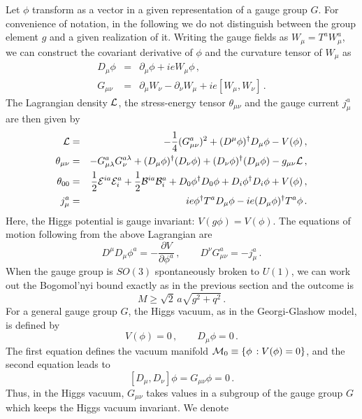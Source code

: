 Let $\phi$ transform as a vector in a given representation of a gauge
group $G$. For convenience of notation, in the following we do not
distinguish between the group element $g$ and a given realization of
it. Writing the gauge fields as $W_\mu=T^aW^a_\mu$, we can construct
the covariant derivative of $\phi$ and the curvature tensor of $W_\mu$
as
\begin{eqnarray}
D_\mu \phi &=& \partial_{\mu} \phi + ie W_{\mu} \phi\,,
\nonumber \\
G_{\mu\nu}&=&\partial_\mu W_\nu -\partial_\nu W_\mu +
ie [W_\mu, W_\nu] \,.
\nonumber
\end{eqnarray}
The Lagrangian density ${\cal L}$, the stress-energy tensor  
$\theta_{\mu\nu}$ and the gauge current $j^a_\mu$ are then given by  
\begin{eqnarray}
{\cal L}&=&-\frac{1}{4}(G^a_{\mu\nu})^2+(D^\mu\phi)^\dagger D_\mu\phi
-V(\phi) \,,
\nonumber\\
\theta_{\mu\nu}&=&-G^a_{\mu\lambda}G^{a\lambda}_\nu +
(D_\mu\phi)^\dagger(D_\nu\phi) + (D_\nu\phi)^\dagger(D_\mu\phi) 
- g_{\mu\nu} {\cal L} \,,
\nonumber \\
\theta_{00}&=& \frac{1}{2}{\cal E}^{ia}{\cal E}^a_i +
\frac{1}{2}{\cal B}^{ia}{\cal B}^a_i +D_0\phi^\dagger D_0\phi +
D_i\phi^\dagger D_i\phi + V(\phi)\,,
\nonumber \\
j^a_\mu &=& ie \phi^\dagger T^a D_\mu\phi -
ie (D_\mu\phi)^\dagger T^a \phi\,.
\label{LIII}
\end{eqnarray}
Here, the Higgs potential is gauge invariant: $V(g\phi)=V(\phi)$. 
The equations of motion following from the above Lagrangian are 
\begin{equation}
D^\mu D_\mu\phi^a=-\frac{\partial V}{\partial \phi^a}\,,\qquad
D^\nu G^a_{\mu\nu} = - j_\mu^a\,.
\label{LIV}
\end{equation}
When the gauge group is $SO(3)$ spontaneously broken to $U(1)$, we can
work out the Bogomol'nyi bound exactly as in the previous section and
the outcome is 
\begin{equation}
M\geq \sqrt 2 \, a \sqrt{g^2 + q^2}\,.
\label{Bbound}
\end{equation}
For a general gauge group $G$, the Higgs vacuum, as in the
Georgi-Glashow model, is defined by  
$$
V(\phi)=0\,,\qquad D_\mu\phi=0 \,.
$$
The first equation defines the vacuum manifold ${\cal M}_0\equiv 
\{\phi\,: V(\phi)=0\}$, and the second equation leads to 
$$
[D_\mu, D_\nu] \phi =G_{\mu\nu} \phi = 0\,. 
$$
Thus, in the Higgs vacuum, $G_{\mu\nu}$ takes values in a subgroup of
the gauge group $G$ which keeps the Higgs vacuum invariant. We denote
